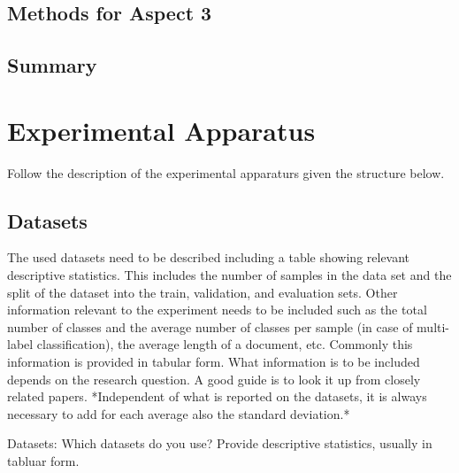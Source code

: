 \documentclass[sigconf, review, nonacm]{acmart}
\begin{document}
\subsection{Methods for Aspect 3}




\subsection{Summary}

\section{Experimental Apparatus}
\label{sec:experimentalapparatus}

Follow the description of the experimental apparaturs given the structure below.



\subsection{Datasets}
\label{sec:datasets}

\begin{tcolorbox}
    [title=Dataset: What needs to be included in the description?]
    The used datasets need to be described including a table showing relevant descriptive statistics. 
    This includes the number of samples in the data set and the split of the dataset into the train, validation, and evaluation sets. Other information relevant to the experiment needs to be included such as the total number of classes and the average number of classes per sample (in case of multi-label classification), the average length of a document, etc. Commonly this information is provided in tabular form. 
    What information is to be included depends on the research question. 
    A good guide is to look it up from closely related papers. *Independent of what is reported on the datasets, it is always necessary to add for each average also the standard deviation.* 
\end{tcolorbox}

Datasets: Which datasets do you use?
Provide descriptive statistics, usually in tabluar form.

\end{document}
